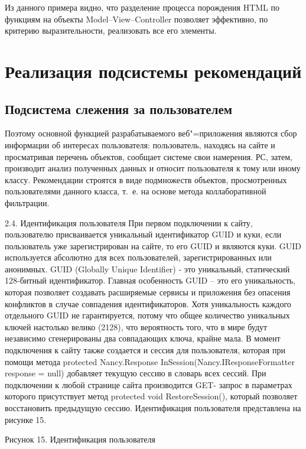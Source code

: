 \documentclass[a4paper,14pt,openany,final]{extreport} %
\begin{document}
{Из данного примера видно, что разделение процесса порождения HTML по функциям на объекты \foreignlanguage{english}{Model--View--Controller} позволяет эффективно, по критерию выразительности, реализовать все его элементы.

\section{Реализация подсистемы рекомендаций}



\subsection{Подсистема слежения за пользователем}
Поэтому основной функцией разрабатываемого веб"=приложения являются сбор информации об интересах пользователя: пользователь, находясь на сайте и просматривая перечень объектов, сообщает системе свои намерения. РС, затем, производит анализ полученных данных и относит пользователя к тому или иному классу. Рекомендации строятся в виде подмножеств объектов, просмотренных пользователями данного класса, т.~е. на основе метода коллаборативной фильтрации.

2.4.	Идентификация пользователя
При первом подключении к сайту, пользователю присваивается уникальный идентификатор GUID и куки, если пользователь уже зарегистрирован на сайте, то его GUID и являются куки. GUID используется абсолютно для всех пользователей, зарегистрированных или анонимных. GUID (Globally Unique Identifier) - это уникальный, статический 128-битный идентификатор. Главная особенность GUID – это его уникальность, которая позволяет создавать расширяемые сервисы и приложения без опасения конфликтов в случае совпадения идентификаторов. Хотя уникальность каждого отдельного GUID не гарантируется, потому что общее количество уникальных ключей настолько велико (2128), что вероятность того, что в мире будут независимо сгенерированы два совпадающих ключа, крайне мала. В момент подключения к сайту также создается и сессия для пользователя, которая при помощи метода protected Nancy.Response InSession(Nancy.IResponseFormatter response = null) добавляет текущую сессию в словарь всех сессий. При подключении к любой странице сайта производится GET- запрос в параметрах которого присутствует метод protected void RestoreSession(), который позволяет восстановить предыдущую сессию. Идентификация пользователя представлена на рисунке 15.


Рисунок 15. Идентификация пользователя


}
\end{document}
